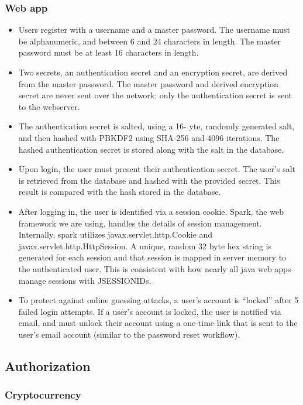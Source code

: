 \documentclass[12pt]{article}
\begin{document}
\subsubsection*{Web app}

\begin{itemize}
	\item Users register with a username and a master password. The username must be alphanumeric, and between 6 and 24 characters in length.
	The master password must be at least 16 characters in length.
	\item Two secrets, an authentication secret and an encryption secret, are derived from the master password.
	The master password and derived encryption secret are never sent over the network; only the authentication secret is sent to the webserver.
	\item The authentication secret is salted, using a 16- yte, randomly generated salt, and then hashed with PBKDF2 using SHA-256 and 4096 iterations.
	The hashed authentication secret is stored along with the salt in the database.
	\item Upon login, the user must present their authentication secret. The user's salt is retrieved from the database and hashed with the provided secret.
	This result is compared with the hash stored in the database.
	\item After logging in, the user is identified via a session cookie.
	Spark, the web framework we are using, handles the details of session management. Internally, spark utilizes javax.servlet.http.Cookie and javax.servlet.http.HttpSession.
	A unique, random 32 byte hex string is generated for each session and that session is mapped in server memory to the authenticated user. This is consistent with how nearly all
	java web apps manage sessions with JSESSIONIDs.
	\item To protect against online guessing attacks, a user's account is ``locked'' after 5 failed login attempts.
	If a user's account is locked, the user is notified via email, and must unlock their account using a one-time link that is sent to the user's email account (similar to the password reset workflow).
\end{itemize}

\subsection{Authorization}

\subsubsection*{Cryptocurrency}
\end{document}
